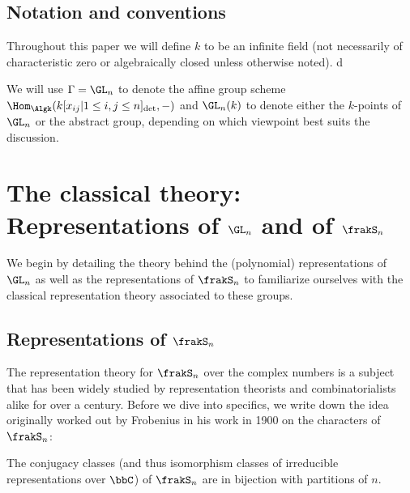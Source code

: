 \documentclass[12pt]{article}
\begin{document}
\subsection{Notation and conventions}\label{subsec:notation}
Throughout this paper we will define $k$ to be an infinite field (not necessarily of characteristic zero or algebraically closed unless otherwise noted).
d%

We will use $\Gamma=\GL_n$ to denote the affine group scheme $\Hom_{\Algk}(k[x_{ij}|1\le i,j\le n]_{\det},-)$ and $\GL_n(k)$ to denote either the $k$-points of $\GL_n$
or the abstract group, depending on which viewpoint best suits the discussion.



\newpage
\section{The classical theory: Representations of \texorpdfstring{$\GL_n$}{GLn} and of \texorpdfstring{$\frakS_n$}{Sn}}
We begin by detailing the theory behind the (polynomial) representations of $\GL_n$ as well as the representations of $\frakS_n$ to 
familiarize ourselves with the classical representation theory associated to these groups.

\subsection{Representations of \texorpdfstring{$\frakS_n$}{Sn}}
The representation theory for $\frakS_n$ over the complex numbers is a subject that has been widely studied by representation theorists 
and combinatorialists alike for over a century. Before we dive into specifics, we write down the idea originally worked out by Frobenius \cite{frobenius-charaktere}
in his work in 1900 on the characters of $\frakS_n$:
\begin{thm}\label{thm:frob-conj}
	The conjugacy classes (and thus isomorphism classes of irreducible representations over $\bbC$) of $\frakS_n$
	are in bijection with partitions of $n$.
\end{thm}
\end{document}
